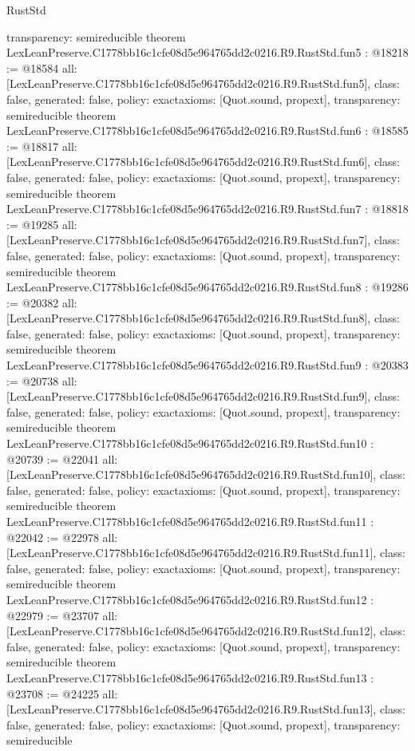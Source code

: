 \begin{lexlean}{RustStd}
\begin{coremodule}
{  transparency: semireducible
}
theorem LexLeanPreserve.C1778bb16c1cfe08d5e964765dd2c0216.R9.RustStd.fun5 : @18218 := @18584 {
  all: [LexLeanPreserve.C1778bb16c1cfe08d5e964765dd2c0216.R9.RustStd.fun5],
  class: false,
  generated: false,
  policy: exact{axioms: [Quot.sound, propext]},
  transparency: semireducible
}
theorem LexLeanPreserve.C1778bb16c1cfe08d5e964765dd2c0216.R9.RustStd.fun6 : @18585 := @18817 {
  all: [LexLeanPreserve.C1778bb16c1cfe08d5e964765dd2c0216.R9.RustStd.fun6],
  class: false,
  generated: false,
  policy: exact{axioms: [Quot.sound, propext]},
  transparency: semireducible
}
theorem LexLeanPreserve.C1778bb16c1cfe08d5e964765dd2c0216.R9.RustStd.fun7 : @18818 := @19285 {
  all: [LexLeanPreserve.C1778bb16c1cfe08d5e964765dd2c0216.R9.RustStd.fun7],
  class: false,
  generated: false,
  policy: exact{axioms: [Quot.sound, propext]},
  transparency: semireducible
}
theorem LexLeanPreserve.C1778bb16c1cfe08d5e964765dd2c0216.R9.RustStd.fun8 : @19286 := @20382 {
  all: [LexLeanPreserve.C1778bb16c1cfe08d5e964765dd2c0216.R9.RustStd.fun8],
  class: false,
  generated: false,
  policy: exact{axioms: [Quot.sound, propext]},
  transparency: semireducible
}
theorem LexLeanPreserve.C1778bb16c1cfe08d5e964765dd2c0216.R9.RustStd.fun9 : @20383 := @20738 {
  all: [LexLeanPreserve.C1778bb16c1cfe08d5e964765dd2c0216.R9.RustStd.fun9],
  class: false,
  generated: false,
  policy: exact{axioms: [Quot.sound, propext]},
  transparency: semireducible
}
theorem LexLeanPreserve.C1778bb16c1cfe08d5e964765dd2c0216.R9.RustStd.fun10 : @20739 := @22041 {
  all: [LexLeanPreserve.C1778bb16c1cfe08d5e964765dd2c0216.R9.RustStd.fun10],
  class: false,
  generated: false,
  policy: exact{axioms: [Quot.sound, propext]},
  transparency: semireducible
}
theorem LexLeanPreserve.C1778bb16c1cfe08d5e964765dd2c0216.R9.RustStd.fun11 : @22042 := @22978 {
  all: [LexLeanPreserve.C1778bb16c1cfe08d5e964765dd2c0216.R9.RustStd.fun11],
  class: false,
  generated: false,
  policy: exact{axioms: [Quot.sound, propext]},
  transparency: semireducible
}
theorem LexLeanPreserve.C1778bb16c1cfe08d5e964765dd2c0216.R9.RustStd.fun12 : @22979 := @23707 {
  all: [LexLeanPreserve.C1778bb16c1cfe08d5e964765dd2c0216.R9.RustStd.fun12],
  class: false,
  generated: false,
  policy: exact{axioms: [Quot.sound, propext]},
  transparency: semireducible
}
theorem LexLeanPreserve.C1778bb16c1cfe08d5e964765dd2c0216.R9.RustStd.fun13 : @23708 := @24225 {
  all: [LexLeanPreserve.C1778bb16c1cfe08d5e964765dd2c0216.R9.RustStd.fun13],
  class: false,
  generated: false,
  policy: exact{axioms: [Quot.sound, propext]},
  transparency: semireducible
}
\end{coremodule}
\end{lexlean}
